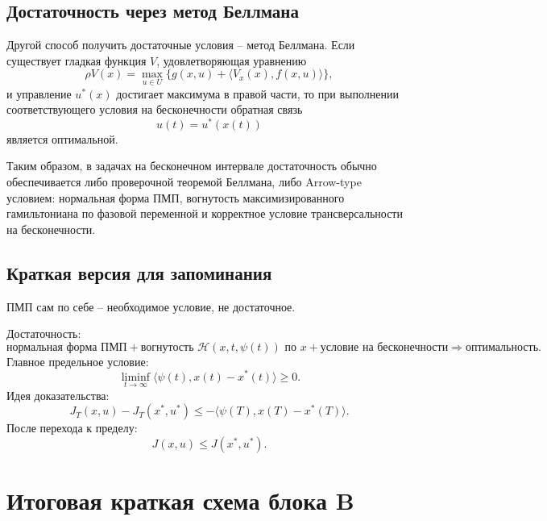 \documentclass[12pt,a4paper]{article}
\begin{document}
\subsection{Достаточность через метод Беллмана}

Другой способ получить достаточные условия -- метод Беллмана. Если существует гладкая функция \(V\), удовлетворяющая уравнению
\[
    \rho V(x)=\max_{u\in U}\{g(x,u)+\langle V_x(x),f(x,u)\rangle\},
\]
и управление \(u^*(x)\) достигает максимума в правой части, то при выполнении соответствующего условия на бесконечности обратная связь
\[
    u(t)=u^*(x(t))
\]
является оптимальной.

Таким образом, в задачах на бесконечном интервале достаточность обычно обеспечивается либо проверочной теоремой Беллмана, либо Arrow-type условием: нормальная форма ПМП, вогнутость максимизированного гамильтониана по фазовой переменной и корректное условие трансверсальности на бесконечности.

\subsection{Краткая версия для запоминания}

ПМП сам по себе -- необходимое условие, не достаточное.

Достаточность:
\[
    \text{нормальная форма ПМП}
    +
    \text{вогнутость }\mathcal H(x,t,\psi(t))\text{ по }x
    +
    \text{условие на бесконечности}
    \Rightarrow
    \text{оптимальность}.
\]
Главное предельное условие:
\[
    \liminf_{t\to\infty}\langle \psi(t),x(t)-x^*(t)\rangle\ge0.
\]
Идея доказательства:
\[
    J_T(x,u)-J_T(x^*,u^*)
    \le
    -\langle\psi(T),x(T)-x^*(T)\rangle.
\]
После перехода к пределу:
\[
    J(x,u)\le J(x^*,u^*).
\]

\newpage

\section*{Итоговая краткая схема блока B}
\end{document}
